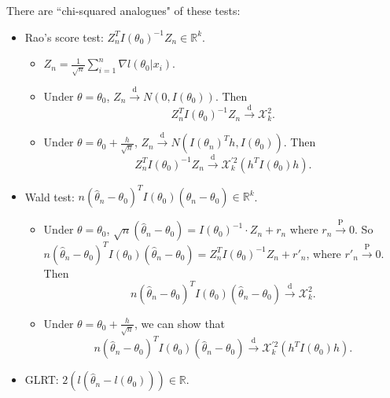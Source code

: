 \documentclass[a4paper]{article}
\begin{document}
\begin{answer}
	There are ``chi-squared analogues" of these tests:
	\begin{itemize}[leftmargin=*]
		\item Rao's score test: $Z_n^T I(\theta_0)^{-1} Z_n \in \mathbb{R}^k$.
		\begin{itemize}
			\item $Z_n = \frac{1}{\sqrt{n}} \sum\limits_{i=1}^n \nabla l(\theta_0|x_i).$
			\item Under $\theta = \theta_0$, $Z_n \stackrel{\text{d}}{\longrightarrow} N(0,I(\theta_0))$. Then
			\begin{equation*}
				Z_n^T I(\theta_0)^{-1} Z_n \stackrel{\text{d}}{\longrightarrow} \mathcal{X}_k^2.
			\end{equation*}
			\item Under $\theta = \theta_0 + \frac{h}{\sqrt{n}}$, $Z_n \stackrel{\text{d}}{\longrightarrow} N(I(\theta_n)^T h,I(\theta_0))$. Then
			\begin{equation*}
				Z_n^T I(\theta_0)^{-1} Z_n \stackrel{\text{d}}{\longrightarrow} \mathcal{X}_k^{'2} \left(h^T I(\theta_0) h\right).
			\end{equation*}
		\end{itemize}
		\item Wald test: $n (\hat{\theta}_n - \theta_0)^T I(\theta_0)(\hat{\theta}_n - \theta_0) \in \mathbb{R}^k $.
		\begin{itemize}
			\item Under $\theta = \theta_0$, $\sqrt{n} (\hat{\theta}_n - \theta_0) = I(\theta_0)^{-1} \cdot Z_n + r_n$ where $r_n \stackrel{\text{P}}{\longrightarrow} 0$. So $n (\hat{\theta}_n - \theta_0)^T I(\theta_0)(\hat{\theta}_n - \theta_0) = Z_n^T I(\theta_0)^{-1} Z_n + r'_n$, where $r'_n \stackrel{\text{P}}{\longrightarrow} 0$. Then
			\begin{equation*}
				n (\hat{\theta}_n - \theta_0)^T I(\theta_0)(\hat{\theta}_n - \theta_0) \stackrel{\text{d}}{\longrightarrow} \mathcal{X}_k^2.
			\end{equation*}
			\item Under $\theta = \theta_0 + \frac{h}{\sqrt{n}}$, we can show that
			\begin{equation*}
				n (\hat{\theta}_n - \theta_0)^T I(\theta_0)(\hat{\theta}_n - \theta_0) \stackrel{\text{d}}{\longrightarrow} \mathcal{X}_k^{'2} \left(h^T I(\theta_0) h\right).
			\end{equation*}
		\end{itemize}
	\item GLRT: $2 (l(\hat{\theta}_n - l(\theta_0))) \in \mathbb{R}$.

\end{itemize}
\end{answer}
\end{document}

